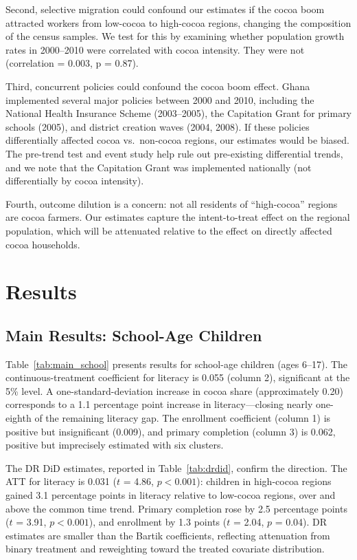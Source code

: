 \documentclass[12pt]{article}
\begin{document}
Second, selective migration could confound our estimates if the cocoa boom attracted workers from low-cocoa to high-cocoa regions, changing the composition of the census samples. We test for this by examining whether population growth rates in 2000--2010 were correlated with cocoa intensity. They were not (correlation = 0.003, p = 0.87).

Third, concurrent policies could confound the cocoa boom effect. Ghana implemented several major policies between 2000 and 2010, including the National Health Insurance Scheme (2003--2005), the Capitation Grant for primary schools (2005), and district creation waves (2004, 2008). If these policies differentially affected cocoa vs.\ non-cocoa regions, our estimates would be biased. The pre-trend test and event study help rule out pre-existing differential trends, and we note that the Capitation Grant was implemented nationally (not differentially by cocoa intensity).

Fourth, outcome dilution is a concern: not all residents of ``high-cocoa'' regions are cocoa farmers. Our estimates capture the intent-to-treat effect on the regional population, which will be attenuated relative to the effect on directly affected cocoa households.


\section{Results}
\label{sec:results}

\subsection{Main Results: School-Age Children}



Table~\ref{tab:main_school} presents results for school-age children (ages 6--17). The continuous-treatment coefficient for literacy is 0.055 (column 2), significant at the 5\% level. A one-standard-deviation increase in cocoa share (approximately 0.20) corresponds to a 1.1 percentage point increase in literacy---closing nearly one-eighth of the remaining literacy gap. The enrollment coefficient (column 1) is positive but insignificant (0.009), and primary completion (column 3) is 0.062, positive but imprecisely estimated with six clusters.

The DR DiD estimates, reported in Table~\ref{tab:drdid}, confirm the direction. The ATT for literacy is 0.031 ($t$ = 4.86, $p < 0.001$): children in high-cocoa regions gained 3.1 percentage points in literacy relative to low-cocoa regions, over and above the common time trend. Primary completion rose by 2.5 percentage points ($t$ = 3.91, $p < 0.001$), and enrollment by 1.3 points ($t$ = 2.04, $p$ = 0.04). DR estimates are smaller than the Bartik coefficients, reflecting attenuation from binary treatment and reweighting toward the treated covariate distribution.
\end{document}
